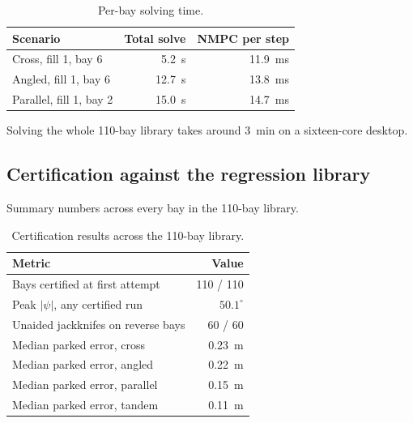 \documentclass[conference]{IEEEtran}
\begin{document}
\begin{table}[t]
    \centering
    \caption{Per-bay solving time.}
    \label{tab:timing}
    \begin{tabular}{lrr}
        \toprule
        Scenario & Total solve & NMPC per step \\
        \midrule
        Cross, fill 1, bay 6     & \SI{5.2}{\second}  & \SI{11.9}{\milli\second} \\
        Angled, fill 1, bay 6    & \SI{12.7}{\second} & \SI{13.8}{\milli\second} \\
        Parallel, fill 1, bay 2  & \SI{15.0}{\second} & \SI{14.7}{\milli\second} \\
        \bottomrule
    \end{tabular}
\end{table}

Solving the whole 110-bay library takes around \SI{3}{\minute} on a
sixteen-core desktop.

\subsection{Certification against the regression library}

Summary numbers across every bay in the 110-bay library.

\begin{table}[t]
    \centering
    \caption{Certification results across the 110-bay library.}
    \label{tab:regression}
    \begin{tabular}{lr}
        \toprule
        Metric & Value \\
        \midrule
        Bays certified at first attempt         & 110 / 110 \\
        Peak $|\psi|$, any certified run        & $50.1^{\circ}$ \\
        Unaided jackknifes on reverse bays      & 60 / 60 \\
        Median parked error, cross              & \SI{0.23}{\meter} \\
        Median parked error, angled             & \SI{0.22}{\meter} \\
        Median parked error, parallel           & \SI{0.15}{\meter} \\
        Median parked error, tandem             & \SI{0.11}{\meter} \\
        \bottomrule
    \end{tabular}
\end{table}
\end{document}
